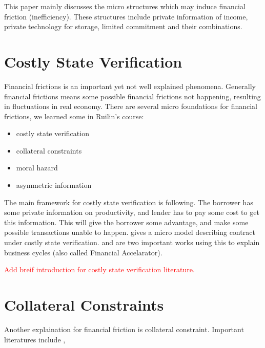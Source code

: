 \documentclass{book}
\theoremstyle{plain}
\theoremstyle{definition}
\begin{document}
This paper mainly discusses the micro structures which may induce financial friction (inefficiency). These structures include private information of income, private technology for storage, limited commitment and their combinations.





\section{Costly State Verification} %
\label{sec:costly_state_verification}

Financial frictions is an important yet not well explained phenomena. Generally financial frictions means some possible financial frictions not happening, resulting in fluctuations in real economy. There are several micro foundations for financial frictions, we learned some in Ruilin's course:
\begin{itemize}
	\item costly state verification
	\item collateral constraints
	\item moral hazard
	\item asymmetric information
\end{itemize}

The main framework for costly state verification is following. The borrower has some private information on productivity, and lender has to pay some cost to get this information. This will give the borrower some advantage, and make some possible transactions unable to happen. \cite{Townsend:1979ef} gives a micro model describing contract under costly state verification. \cite{BenBernanke:1989eg} and \cite{Carlstrom:1997fb} are two important works using this to explain business cycles (also called Financial Accelarator).

\textcolor{red}{Add breif introduction for costly state verification literature.}



\section{Collateral Constraints} %
\label{sec:collateral_constraints}


Another explaination for financial friction is collateral constraint. Important literatures include \cite{Kiyotaki:1997hl},
\end{document}
